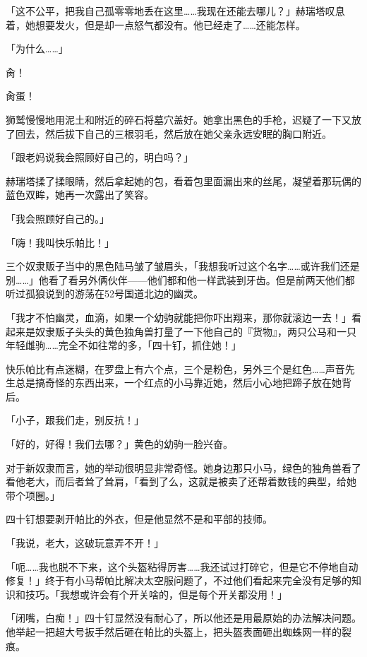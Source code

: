 「这不公平，把我自己孤零零地丢在这里……我现在还能去哪儿？」赫瑞塔叹息着，她想要发火，但是却一点怒气都没有。他已经走了……还能怎样。

「为什么……」

肏！

肏蛋！

狮鹫慢慢地用泥土和附近的碎石将墓穴盖好。她拿出黑色的手枪，迟疑了一下又放了回去，然后拔下自己的三根羽毛，然后放在她父亲永远安眠的胸口附近。

「跟老妈说我会照顾好自己的，明白吗？」

赫瑞塔揉了揉眼睛，然后拿起她的包，看着包里面漏出来的丝尾，凝望着那玩偶的蓝色双眸，她再一次露出了笑容。

「我会照顾好自己的。」

\horizonline


「嗨！我叫快乐帕比！」

三个奴隶贩子当中的黑色陆马皱了皱眉头，「我想我听过这个名字……或许我们还是别……」他看了看另外俩伙伴——他们都和他一样武装到牙齿。但是前两天他们都听过孤狼说到的游荡在52号国道北边的幽灵。

「我才不怕幽灵，血滴，如果一个幼驹就能把你吓出翔来，那你就滚边一去！」看起来是奴隶贩子头头的黄色独角兽打量了一下他自己的『货物』，两只公马和一只年轻雌驹……完全不如往常的多，「四十钉，抓住她！」

快乐帕比有点迷糊，在罗盘上有六个点，三个是粉色，另外三个是红色……声音先生总是搞奇怪的东西出来，一个红点的小马靠近她，然后小心地把蹄子放在她背后。

「小子，跟我们走，别反抗！」

「好的，好得！我们去哪？」黄色的幼驹一脸兴奋。

对于新奴隶而言，她的举动很明显非常奇怪。她身边那只小马，绿色的独角兽看了看他老大，而后者耸了耸肩，「看到了么，这就是被卖了还帮着数钱的典型，给她带个项圈。」

四十钉想要剥开帕比的外衣，但是他显然不是和平部的技师。

「我说，老大，这破玩意弄不开！」

「呃……我也脱不下来，这个头盔粘得厉害……我还试过打碎它，但是它不停地自动修复！」终于有小马帮帕比解决太空服问题了，不过他们看起来完全没有足够的知识和技巧。「我想或许会有个开关啥的，但是每个开关都没用！」

「闭嘴，白痴！」四十钉显然没有耐心了，所以他还是用最原始的办法解决问题。他举起一把超大号扳手然后砸在帕比的头盔上，把头盔表面砸出蜘蛛网一样的裂痕。

